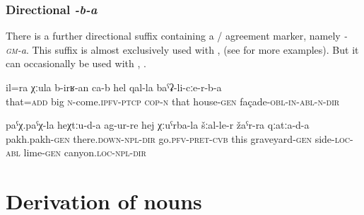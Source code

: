 
\subsubsection{Directional \textit{-b-a}}
\label{sssec:Directional -gm-a}

There is a further directional suffix containing a / agreement marker, namely \textit{-\textsc{gm}-a}. This suffix is almost exclusively used with  ,  (see  for more examples). But it can occasionally be used with  , .
%
\begin{exe}
	\ex	\label{This is also growing along the façade of the house}
	\gll	il=ra	χːula	b-irʁ-an ca-b	hel	qal-la	baˁʡ-li-cːe-r-b-a\\
		that=\textsc{add}	big	\textsc{n}-come.\textsc{ipfv}-\textsc{ptcp} \textsc{cop-n}	that	house-\textsc{gen}	façade-\textsc{obl-in}-\textsc{abl}-\textsc{n}-\textsc{dir}\\
	\glt	{}
	
	\ex	\label{They went in the direction of pakh-pakh (\isi{microtoponym}), across the side of the graveyard,}
	\gll	paˁχ.paˁχ-la	heχtːu-d-a	ag-ur-re	hej	χːuˁrba-la	šːal-le-r žaˁr-ra	qːatːa-d-a \\
		pakh.pakh-\textsc{gen}	there.\textsc{down-npl}-\textsc{dir}	go.\textsc{pfv}-\textsc{pret}-\textsc{cvb}	this	graveyard-\textsc{gen}	side-\textsc{loc}-\textsc{abl}	lime-\textsc{gen}	canyon.\textsc{loc}-\textsc{npl}-\textsc{dir}\\
	\glt	{}
\end{exe}



\section{Derivation of nouns}
\label{sec:nounderivation}


